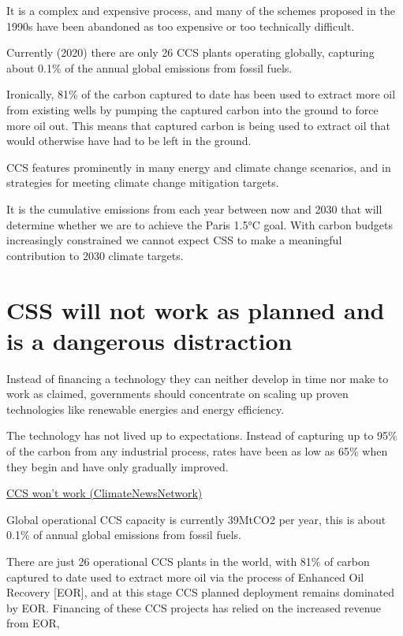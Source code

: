\documentclass[
]{book}
\begin{document}
It is a complex and expensive process, and many of the schemes proposed in the 1990s
have been abandoned as too expensive or too technically difficult.

Currently (2020) there are only 26 CCS plants operating globally,
capturing about 0.1\% of the annual global emissions from fossil fuels.

Ironically, 81\% of the carbon captured to date has been used to
extract more oil from existing wells by pumping the captured carbon into the ground
to force more oil out.
This means that captured carbon is being used to extract oil that
would otherwise have had to be left in the ground.

CCS features prominently in many energy and climate change scenarios,
and in strategies for meeting climate change mitigation targets.

It is the cumulative emissions from each year between now and 2030 that will
determine whether we are to achieve the Paris 1.5°C goal.
With carbon budgets increasingly constrained we cannot expect
CSS to make a meaningful contribution to 2030 climate targets.

\hypertarget{css-will-not-work-as-planned-and-is-a-dangerous-distraction}{%
\section{CSS will not work as planned and is a dangerous distraction}\label{css-will-not-work-as-planned-and-is-a-dangerous-distraction}}

Instead of financing a technology they can neither develop in time
nor make to work as claimed,
governments should concentrate on scaling up proven technologies
like renewable energies and energy efficiency.

The technology has not lived up to expectations.
Instead of capturing up to 95\% of the carbon from any industrial process,
rates have been as low as 65\% when they begin and have only gradually improved.

\href{https://climatenewsnetwork.net/carbon-capture-and-storage-wont-work-critics-say/}{CCS won't work (ClimateNewsNetwork)}

Global operational CCS capacity is currently 39MtCO2 per year,
this is about 0.1\% of annual global emissions from fossil fuels.

There are just 26 operational CCS plants in the world,
with 81\% of carbon captured to date used to extract more oil
via the process of Enhanced Oil Recovery {[}EOR{]}, and at this stage
CCS planned deployment remains dominated by EOR.
Financing of these CCS projects has relied on the increased revenue from EOR,
\end{document}
